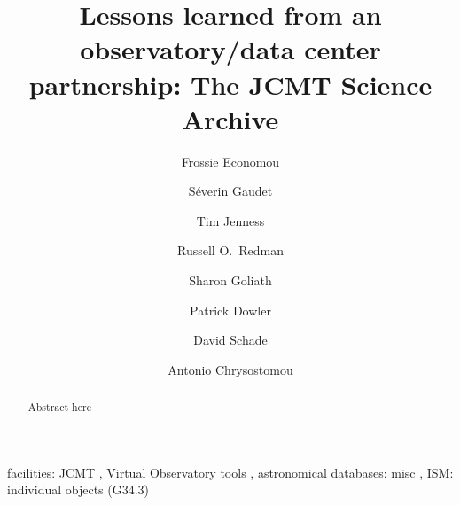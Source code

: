 \documentclass[final,authoryear,5p,times,twocolumn]{elsarticle}
\begin{document}
\begin{frontmatter}



\title{Lessons learned from an observatory/data center partnership:
  The JCMT Science Archive}


\author[noao]{Frossie Economou}
\author[cadc]{S\'{e}verin Gaudet}
\author[cornell,jac]{Tim Jenness}
\author[jac]{Russell O.\ Redman}
\author[cadc]{Sharon Goliath}
\author[cadc]{Patrick Dowler}
\author[cadc]{David Schade}
\author[uherts,jac]{Antonio Chrysostomou}



\address[noao]{National Optical Astronomy Observatory, 950 N Cherry Ave, Tucson, AZ 85719, USA}
\address[cornell]{Department of Astronomy, Cornell University, Ithaca,
  NY 14853, USA}
\address[jac]{Joint Astronomy Centre, 660 N.\ A`oh\=ok\=u Place, Hilo, HI
  96720, USA}
\address[cadc]{Canadian Astronomy Data Centre, National Research Council of Canada, 5071 West Saanich Road., Victoria, BC V9E 2E7, Canada}
\address[uherts]{Centre for Astrophysics Research, University of Hertfordshire, College Lane, Hatfield, Hertfordshire AL10 9AB, UK}

\begin{abstract}

{\color{red}
Abstract here
}

\end{abstract}

\begin{keyword}


facilities: JCMT \sep
Virtual Observatory tools \sep
astronomical databases: misc \sep
ISM: individual objects (G34.3)

\end{keyword}

\end{frontmatter}
\end{document}
